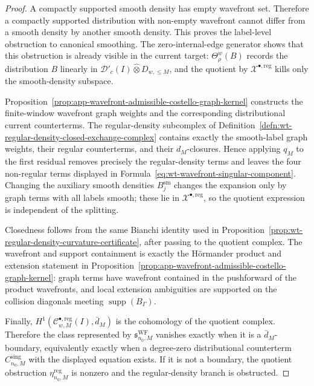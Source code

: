 \begin{proof}
  A compactly supported smooth density has empty wavefront set.  Therefore
  a compactly supported distribution with non-empty wavefront cannot differ
  from a smooth density by another smooth density.  This proves the
  label-level obstruction to canonical smoothing.  The zero-internal-edge
  generator shows that this obstruction is already visible in the current
  target: \(\Theta^w_\rho(B)\) records the distribution \(B\) linearly in
  \(\mathcal D'_c(I)\widehat\otimes D_{w,\leq M}\), and the quotient by
  \(\mathcal X^{\bullet,\mathrm{reg}}\) kills only the smooth-density
  subspace.

  Proposition~\ref{prop:app-wavefront-admissible-costello-graph-kernel}
  constructs the finite-window wavefront graph weights and the
  corresponding distributional current counterterms.  The regular-density
  subcomplex of
  Definition~\ref{defn:wt-regular-density-closed-exchange-complex} contains
  exactly the smooth-label graph weights, their regular counterterms, and
  their \(d_M\)-closures.  Hence applying \(q_M\) to the first residual
  removes precisely the regular-density terms and leaves the four
  non-regular terms displayed in
  Formula~\eqref{eq:wt-wavefront-singular-component}.  Changing the auxiliary
  smooth densities \(B_j^{\mathrm{sm}}\) changes the expansion only by
  graph terms with all labels smooth; these lie in
  \(\mathcal X^{\bullet,\mathrm{reg}}\), so the quotient expression is
  independent of the splitting.

  Closedness follows from the same Bianchi identity used in
  Proposition~\ref{prop:wt-regular-density-curvature-certificate}, after
  passing to the quotient complex.  The wavefront and support containment
  is exactly the H\"ormander product and extension statement in
  Proposition~\ref{prop:app-wavefront-admissible-costello-graph-kernel}:
  graph terms have wavefront contained in the pushforward of the product
  wavefronts, and local extension ambiguities are supported on the
  collision diagonals meeting \(\operatorname{supp}(B_\Gamma)\).

  Finally,
  \(H^1(\mathcal C^{\bullet,\mathrm{reg}}_{w,M}(I),\bar d_M)\) is the
  cohomology of the quotient complex.  Therefore the class represented by
  \(\mathfrak s^{\mathrm{WF}}_{n_0,M}\) vanishes exactly when it is a
  \(\bar d_M\)-boundary, equivalently exactly when a degree-zero
  distributional counterterm \(C^{\mathrm{sing}}_{n_0,M}\) with the
  displayed equation exists.  If it is not a boundary, the quotient
  obstruction \(\eta^{\mathrm{reg}}_{n_0,M}\) is nonzero and the
  regular-density branch is obstructed.
\end{proof}

